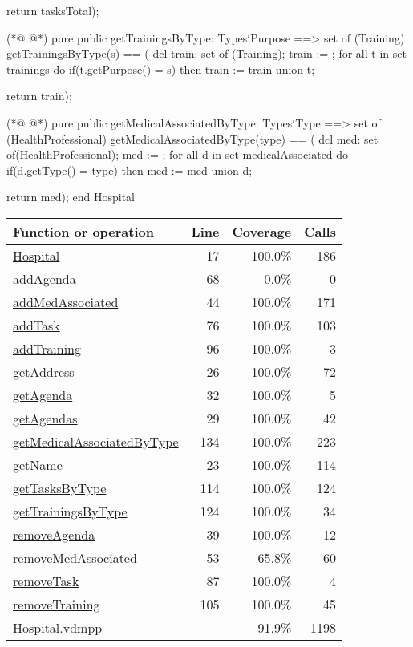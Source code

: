 \begin{vdmpp}[breaklines=true]
   return tasksTotal);
              
(*@
\label{getTrainingsByType:124}
@*)
 pure public getTrainingsByType: Types`Purpose ==> set of (Training)
  getTrainingsByType(s) == (
   dcl train: set of (Training);
   train := {};
   for all t in set trainings do
    if(t.getPurpose() = s)
     then train := train union {t};
     
   return train);

(*@
\label{getMedicalAssociatedByType:134}
@*)
 pure public getMedicalAssociatedByType: Types`Type ==> set of (HealthProfessional)
  getMedicalAssociatedByType(type) == (
   dcl med: set of(HealthProfessional);
   med := {};
   for all d in set medicalAssociated do
    if(d.getType() = type)
     then med := med union {d};
    
   return med);
end Hospital
\end{vdmpp}
\bigskip
\begin{longtable}{|l|r|r|r|}
\hline
Function or operation & Line & Coverage & Calls \\
\hline
\hline
\hyperref[Hospital:17]{Hospital} & 17&100.0\% & 186 \\
\hline
\hyperref[addAgenda:68]{addAgenda} & 68&0.0\% & 0 \\
\hline
\hyperref[addMedAssociated:44]{addMedAssociated} & 44&100.0\% & 171 \\
\hline
\hyperref[addTask:76]{addTask} & 76&100.0\% & 103 \\
\hline
\hyperref[addTraining:96]{addTraining} & 96&100.0\% & 3 \\
\hline
\hyperref[getAddress:26]{getAddress} & 26&100.0\% & 72 \\
\hline
\hyperref[getAgenda:32]{getAgenda} & 32&100.0\% & 5 \\
\hline
\hyperref[getAgendas:29]{getAgendas} & 29&100.0\% & 42 \\
\hline
\hyperref[getMedicalAssociatedByType:134]{getMedicalAssociatedByType} & 134&100.0\% & 223 \\
\hline
\hyperref[getName:23]{getName} & 23&100.0\% & 114 \\
\hline
\hyperref[getTasksByType:114]{getTasksByType} & 114&100.0\% & 124 \\
\hline
\hyperref[getTrainingsByType:124]{getTrainingsByType} & 124&100.0\% & 34 \\
\hline
\hyperref[removeAgenda:39]{removeAgenda} & 39&100.0\% & 12 \\
\hline
\hyperref[removeMedAssociated:53]{removeMedAssociated} & 53&65.8\% & 60 \\
\hline
\hyperref[removeTask:87]{removeTask} & 87&100.0\% & 4 \\
\hline
\hyperref[removeTraining:105]{removeTraining} & 105&100.0\% & 45 \\
\hline
\hline
Hospital.vdmpp & & 91.9\% & 1198 \\
\hline
\end{longtable}

